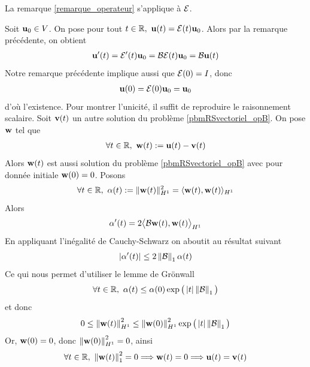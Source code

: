 \begin{remark}
    La remarque \ref{remarque_operateur} s'applique à $\mathcal{E}$.
\end{remark}

Soit $\bm{\mathrm{u}}_0 \in V$. On pose pour tout $t \in \mathbb{R},\ \bm{\mathrm{u}}(t) = \mathcal{E}(t)\bm{\mathrm{u}}_0$.
Alors par la remarque précédente, on obtient
\begin{eqnarray*}
    \bm{\mathrm{u}}'(t) = \mathcal{E}'(t)\bm{\mathrm{u}}_0 = \mathcal{B} \mathcal{E}(t)\bm{\mathrm{u}}_0 = \mathcal{B} \bm{\mathrm{u}}(t)
\end{eqnarray*}
Notre remarque précédente implique aussi que $\mathcal{E}(0) = I$, donc
\begin{eqnarray*}
    \bm{\mathrm{u}}(0) = \mathcal{E}(0)\bm{\mathrm{u}}_0 = \bm{\mathrm{u}}_0
\end{eqnarray*}
d'où l'existence. Pour montrer l'unicité, il suffit de reproduire 
le raisonnement scalaire. Soit $\bm{\mathrm{v}}(t)$ un autre solution du 
problème \eqref{pbmRSvectoriel_opB}. On pose $\bm{\mathrm{w}}$ tel que
\begin{eqnarray*}
    \forall t \in \mathbb{R} ,\ \bm{\mathrm{w}}(t) := \bm{\mathrm{u}}(t) - \bm{\mathrm{v}}(t)
\end{eqnarray*}
Alors $\bm{\mathrm{w}}(t)$ est aussi solution du problème \eqref{pbmRSvectoriel_opB} avec pour donnée initiale $\bm{\mathrm{w}}(0)=0$. Posons 
\begin{equation*}
    \forall t \in \mathbb{R}, \ \alpha(t) := \|\bm{\mathrm{w}}(t)\|_{H^1}^2=\langle \bm{\mathrm{w}}(t), \bm{\mathrm{w}}(t) \rangle_{H^1}
\end{equation*}
Alors
\begin{eqnarray*}
    \alpha'(t)= 2 \big\langle \mathcal{B} \bm{\mathrm{w}}(t), \bm{\mathrm{w}}(t) \big\rangle_{H^1}
\end{eqnarray*}
En appliquant l'inégalité de Cauchy-Schwarz on aboutit au résultat suivant
\begin{eqnarray*}
    \displaystyle\left\lvert \alpha'(t) \right\rvert \leq 2\left\lVert \mathcal{B} \right\rVert_1 \alpha(t)    
\end{eqnarray*}
Ce qui nous permet d'utiliser le lemme de Grönwall
\begin{eqnarray*}
    \forall t \in \mathbb{R}, \ \alpha(t) \leq \alpha(0)\exp\big(\displaystyle\left\lvert t \right\rvert\left\lVert \mathcal{B} \right\rVert_1\big)
\end{eqnarray*}
et donc
\begin{eqnarray*}
    0 \leq \left\lVert \bm{\mathrm{w}}(t) \right\rVert^2_{H^1} \leq \left\lVert \bm{\mathrm{w}}(0) \right\rVert^2_{H^1} \exp\big(\displaystyle\left\lvert t \right\rvert\left\lVert \mathcal{B} \right\rVert_1\big)
\end{eqnarray*}
Or, $\bm{\mathrm{w}}(0) = 0$, donc $\left\lVert \bm{\mathrm{w}}(0) \right\rVert^2_{H^1}=0$, ainsi
\begin{eqnarray*}
    \forall t \in \mathbb{R}, \ \left\lVert \bm{\mathrm{w}}(t) \right\rVert^2_1 = 0 \Longrightarrow \bm{\mathrm{w}}(t) = 0
    \Longrightarrow \bm{\mathrm{u}}(t) = \bm{\mathrm{v}}(t)
\end{eqnarray*}
